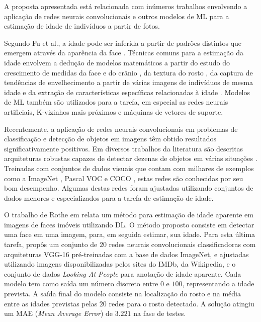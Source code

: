 A proposta apresentada está relacionada com inúmeros trabalhos envolvendo a aplicação de redes neurais convolucionais e outros modelos de ML para a estimação de idade de indivíduos a partir de fotos.

Segundo Fu et al., a idade pode ser inferida a partir de padrões distintos que emergem através da aparência da face \cite{fu2010age}. Técnicas comuns para a estimação da idade envolvem a dedução de modelos matemáticos a partir do estudo do crescimento de medidas da face e do crânio \cite{kwon1999age}, da textura do rosto \cite{lanitis2002toward}, da captura de tendências de envelhecimento a partir de várias imagens de indivíduos de mesma idade \cite{fu2007estimating} e da extração de características específicas relacionadas à idade \cite{suo2008design, lou2018expression}. Modelos de ML também são utilizados para a tarefa, em especial as redes neurais artificiais, K-vizinhos mais próximos e máquinas de vetores de suporte.

Recentemente, a aplicação de redes neurais convolucionais em problemas de classificação e detecção de objetos em imagens têm obtido resultados significativamente positivos. Em  diversos trabalhos da literatura são descritas arquiteturas robustas capazes de detectar dezenas de objetos em várias situações \cite{vggnet, resnet, inception, redmon2016you, ssd}. Treinadas com conjuntos de dados visuais que contam com milhares de exemplos como a ImageNet \cite{ImagenetChall}, Pascal VOC \cite{pascalvoc} e COCO \cite{coco}, estas redes são conhecidas por seu bom desempenho. Algumas destas redes foram ajustadas utilizando conjuntos de dados menores e especializados para a tarefa de estimação de idade.

O trabalho de Rothe em \cite{rothe2015dex} relata um método para estimação de idade aparente em imagens de faces imóveis utilizando DL. O método proposto consiste em detectar uma face em uma imagem, para, em seguida estimar, sua idade. Para esta última tarefa, propôs um conjunto de $20$ redes neurais convolucionais classificadoras com arquiteturas VGG-16 pré-treinadas com a base de dados ImageNet, e ajustadas utilizando imagens disponibilizadas pelos sites do IMDb, da Wikipedia, e o conjunto de dados \emph{Looking At People} para anotação de idade aparente. Cada modelo tem como saída um número discreto entre $0$ e $100$, representando a idade prevista. A saída final do modelo consiste na localização do rosto e na média entre as idades previstas pelas $20$ redes para o rosto detectado. A solução atingiu um MAE (\emph{Mean Average Error}) de $3.221$ na fase de testes.

